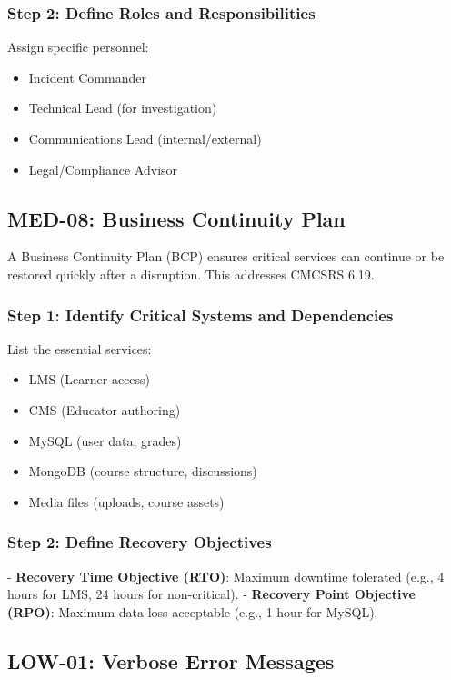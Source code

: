 \subsubsection{Step 2: Define Roles and Responsibilities}

Assign specific personnel:
\begin{itemize}
    \item Incident Commander
    \item Technical Lead (for investigation)
    \item Communications Lead (internal/external)
    \item Legal/Compliance Advisor
\end{itemize}

\subsection{MED-08: Business Continuity Plan}

A Business Continuity Plan (BCP) ensures critical services can continue or be restored quickly after a disruption. This addresses CMCSRS 6.19.

\subsubsection{Step 1: Identify Critical Systems and Dependencies}

List the essential services:
\begin{itemize}
    \item LMS (Learner access)
    \item CMS (Educator authoring)
    \item MySQL (user data, grades)
    \item MongoDB (course structure, discussions)
    \item Media files (uploads, course assets)
\end{itemize}

\subsubsection{Step 2: Define Recovery Objectives}

- \textbf{Recovery Time Objective (RTO)}: Maximum downtime tolerated (e.g., 4 hours for LMS, 24 hours for non‑critical).
- \textbf{Recovery Point Objective (RPO)}: Maximum data loss acceptable (e.g., 1 hour for MySQL).

\subsection{LOW-01: Verbose Error Messages}

